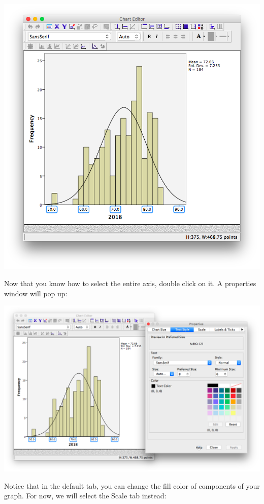 \documentclass[
]{book}
\begin{document}
\includegraphics{img/2.4.24.png}

Now that you know how to select the entire axis, {double click} on it. A properties window will pop up:

\includegraphics{img/2.4.25.png}

Notice that in the default tab, you can change the fill color of components of your graph. For now, we will select the {Scale} tab instead:
\end{document}

